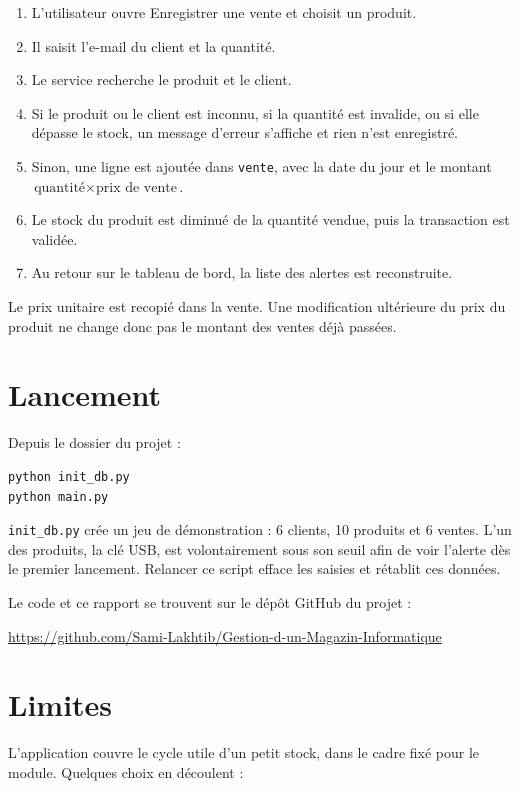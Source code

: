 \documentclass[11pt,a4paper]{article}
\newcommand{\repo}{\url{https://github.com/Sami-Lakhtib/Gestion-d-un-Magazin-Informatique}}
\begin{document}
\begin{enumerate}[leftmargin=1.4em]
    \item L'utilisateur ouvre \og Enregistrer une vente \fg{} et choisit un produit.
    \item Il saisit l'e-mail du client et la quantité.
    \item Le service recherche le produit et le client.
    \item Si le produit ou le client est inconnu, si la quantité est invalide, ou si elle dépasse le stock, un message d'erreur s'affiche et rien n'est enregistré.
    \item Sinon, une ligne est ajoutée dans \texttt{vente}, avec la date du jour et le montant \(\text{quantité} \times \text{prix de vente}\).
    \item Le stock du produit est diminué de la quantité vendue, puis la transaction est validée.
    \item Au retour sur le tableau de bord, la liste des alertes est reconstruite.
\end{enumerate}

Le prix unitaire est recopié dans la vente. Une modification ultérieure du prix du produit ne change donc pas le montant des ventes déjà passées.

\section{Lancement}

Depuis le dossier du projet :

\begin{verbatim}
python init_db.py
python main.py
\end{verbatim}

\texttt{init\_db.py} crée un jeu de démonstration : 6 clients, 10 produits et 6 ventes. L'un des produits, la clé USB, est volontairement sous son seuil afin de voir l'alerte dès le premier lancement. Relancer ce script efface les saisies et rétablit ces données.

Le code et ce rapport se trouvent sur le dépôt GitHub du projet :

\begin{center}
\repo
\end{center}
\newpage
\section{Limites}

L'application couvre le cycle utile d'un petit stock, dans le cadre fixé pour le module. Quelques choix en découlent :
\end{document}
